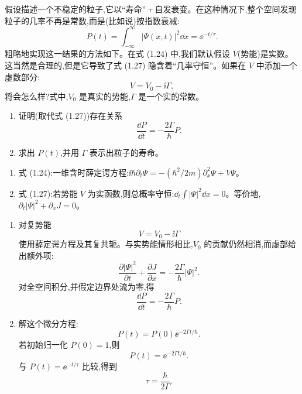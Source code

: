 \begin{question}
假设描述一个不稳定的粒子,它以“寿命” $\tau$ 自发衰变。在这种情况下,整个空间发现粒子的几率不再是常数,而是(比如说)按指数衰减:
\[
P(t)=\int_{-\infty}^{\infty}|\Psi(x,t)|^2\dd x=\ee^{-t/\tau}.
\]
粗略地实现这一结果的方法如下。在式 (1.24) 中,我们默认假设 $V$(势能)是实数。这当然是合理的,但是它导致了式 (1.27) 隐含着“几率守恒”。如果在 $V$ 中添加一个虚数部分:
\[
V=V_0-\ii\Gamma,
\]
将会怎么样?式中,$V_0$ 是真实的势能,$\Gamma$ 是一个实的常数。
\begin{enumerate}
\item 证明(取代式 (1.27))存在关系
\[
\frac{\dd P}{\dd t}=-\frac{2\Gamma}{\hbar}P.
\]
\item 求出 $P(t)$,并用 $\Gamma$ 表示出粒子的寿命。
\end{enumerate}

\par\smallskip
{}
\begin{enumerate}[leftmargin=2.2em,itemsep=0.12em,topsep=0.12em,parsep=0pt]
\item 式 (1.24):一维含时薛定谔方程:$\ii\hbar\partial_t\Psi=-(\hbar^2/2m)\partial_x^2\Psi+V\Psi$。
\item 式 (1.27):若势能 $V$ 为实函数,则总概率守恒:$\dd_t\int |\Psi|^2\dd x=0$。等价地,$\partial_t|\Psi|^2+\partial_xJ=0$。
\end{enumerate}

\end{question}
\begin{solution}
\begin{enumerate}
\item 对复势能
\[
V=V_0-\ii\Gamma
\]
使用薛定谔方程及其复共轭。与实势能情形相比,$V_0$ 的贡献仍然相消,而虚部给出额外项:
\[
\frac{\partial |\Psi|^2}{\partial t}+\frac{\partial J}{\partial x}
=-\frac{2\Gamma}{\hbar}|\Psi|^2.
\]
对全空间积分,并假定边界处流为零,得
\[
\frac{\dd P}{\dd t}=-\frac{2\Gamma}{\hbar}P.
\]
\item 解这个微分方程:
\[
P(t)=P(0)\ee^{-2\Gamma t/\hbar}.
\]
若初始归一化 $P(0)=1$,则
\[
P(t)=\ee^{-2\Gamma t/\hbar}.
\]
与 $P(t)=\ee^{-t/\tau}$ 比较,得到
\[
\tau=\frac{\hbar}{2\Gamma}.
\]
\end{enumerate}
\end{solution}

